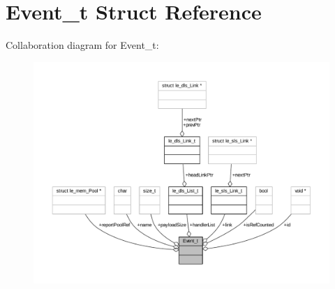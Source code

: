 \hypertarget{struct_event__t}{}\section{Event\+\_\+t Struct Reference}
\label{struct_event__t}


Collaboration diagram for Event\+\_\+t\+:
\nopagebreak
\begin{figure}[H]
\begin{center}
\leavevmode
\includegraphics[width=350pt]{struct_event__t__coll__graph}
\end{center}
\end{figure}
